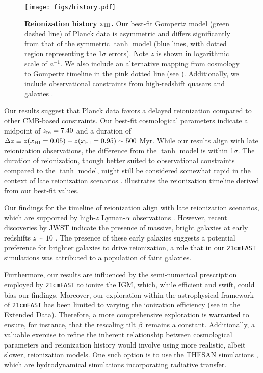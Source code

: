 \begin{figure}
\centering
\texttt{[image: figs/history.pdf]}
\caption{\textbf{Reionization history $x_{\mathrm{HI}}$.}
Our best-fit Gompertz model (green dashed line) of Planck data is
asymmetric and differs significantly from that of the symmetric $\tanh$
model (blue lines, with dotted region representing the 1$\sigma$
errors).
Note $z$ is shown in logarithmic scale of $a^{-1}$.
We also include an alternative mapping from cosmology to Gompertz
timeline in the pink dotted line (see ).
Additionally, we include observational constraints from high-redshift
quasars \cite{Greig2017, Banados2018, Davies2018, Greig2019, Wang2020,
Yang2020, Greig2022, Jin2023} and galaxies \cite{Ouchi2010,
Sobacchi2015, Mason2018, Mason2019, Hoag2019, Mesinger2015}.}
\label{fig:history}
\end{figure}

Our results suggest that Planck data favors a delayed reionization
compared to other CMB-based constraints.
Our best-fit cosmological parameters indicate a midpoint of $z_{\mathrm{re}} =
7.40$ and a duration of $\Delta z \equiv z(x_{\mathrm{HI}} = 0.05) - z(x_{\mathrm{HI}} =
0.95) \sim 500 $ Myr.
While our results align with late reionization observations, the
difference from the $\tanh$ model is within 1$\sigma$.
The duration of reionization, though better suited to observational
constraints compared to the $\tanh$ model, might still be considered
somewhat rapid in the context of late reionization scenarios
\cite{Cain2021}.
 illustrates the reionization timeline derived
from our best-fit values.

Our findings for the timeline of reionization align with late
reionization scenarios, which are supported by high-$z$ Lyman-$\alpha$
observations \cite{Keating2020, Cain2021}.
However, recent discoveries by JWST indicate the presence of massive,
bright galaxies at early redshifts $z \sim 10$
\cite{Adams2023, Bradley2023, Donnan2023}.
The presence of these early galaxies suggests a potential preference for
brighter galaxies to drive reionization, a role that in our
\texttt{21cmFAST} simulations was attributed to a population of faint
galaxies.

Furthermore, our results are influenced by the semi-numerical
prescription employed by \texttt{21cmFAST} to ionize the IGM, which,
while efficient and swift, could bias our findings.
Moreover, our exploration within the astrophysical framework of
\texttt{21cmFAST} has been limited to varying the ionization efficiency
(see  in the Extended Data).
Therefore, a more comprehensive exploration is warranted to ensure, for
instance, that the rescaling tilt $\beta$ remains a constant.
Additionally, a valuable exercise to refine the inherent relationship
between cosmological parameters and reionization history would involve
using more realistic, albeit slower, reionization models.
One such option is to use the THESAN simulations \cite{Kannan2022},
which are hydrodynamical simulations incorporating radiative transfer.



